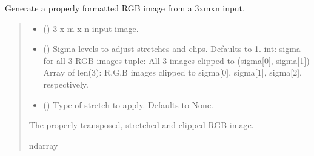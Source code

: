 \documentclass[letterpaper,10pt,english]{sphinxmanual}
\begin{document}
\begin{fulllineitems}
\label{\detokenize{modules:cubespa.utils.normalized_rgb_image}}
\pysigstartsignatures
{}
\pysigstopsignatures
\sphinxAtStartPar
Generate a properly formatted RGB image from a 3xmxn input.
\begin{quote}\begin{description}
\begin{itemize}
\item {} 
\sphinxAtStartPar
{} () \textendash{} 3 x m x n input image.

\item {} 
\sphinxAtStartPar
{} (\sphinxstyleliteralemphasis{\sphinxupquote{, }}) \textendash{} Sigma levels to adjust stretches and clips. Defaults to 1.
int: sigma for all 3 RGB images
tuple: All 3 images clipped to (sigma{[}0{]}, sigma{[}1{]})
Array of len(3): R,G,B images clipped to sigma{[}0{]}, sigma{[}1{]}, sigma{[}2{]}, respectively.

\item {} 
\sphinxAtStartPar
{} (\sphinxstyleliteralemphasis{\sphinxupquote{, }}) \textendash{} Type of stretch to apply. Defaults to None.

\end{itemize}

\sphinxAtStartPar
The properly transposed, stretched and clipped RGB image.

\sphinxAtStartPar
ndarray

\end{description}\end{quote}

\end{fulllineitems}
\end{document}
